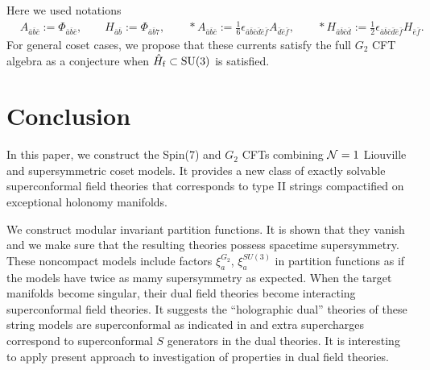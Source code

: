 \documentclass[a4paper,12pt]{article}
\numberwithin{equation}{section}
\newcommand{\Ncal}{{\cal N}}
\newcommand{\As}{*A}
\newcommand{\Hs}{*H}
\newcommand{\Spin}[1]{{\rm Spin}(#1)}
\newcommand{\SU}[1]{{\rm SU}(#1)}
\newcommand{\Hf}{\hat{H}_{\rm f}}
\newcommand{\gh}[1]{\bar{#1}}
\newcommand{\ab}{\gh a}
\newcommand{\bb}{\gh b}
\newcommand{\cb}{\gh c}
\newcommand{\db}{\gh d}
\newcommand{\eb}{\gh e}
\newcommand{\fb}{\gh f}
\begin{document}
Here we used notations
\begin{align*}
 &A_{\ab\bb\cb}:=\Phi_{\ab\bb\cb},\qquad H_{\ab\bb}:=\Phi_{\ab\bb 7},\qquad
   \As_{\ab\bb\cb}:=\frac{1}{6}
              \epsilon_{\ab\bb\cb\db\eb\fb}A_{\db\eb\fb},\qquad
   \Hs_{\ab\bb\cb\db}:=\frac{1}{2}\epsilon_{\ab\bb\cb\db\eb\fb}H_{\eb\fb}.
\end{align*}
For general coset cases, 
we propose that these currents satisfy the full $G_2$ CFT algebra 
as a conjecture when $\Hf \subset \SU3$ is satisfied. 


\section{Conclusion}\label{conclusion}
In this paper, we construct the \Spin 7 and $G_2$ CFTs combining
 $\Ncal=1$ Liouville and supersymmetric coset models. 
It provides a new class of exactly solvable superconformal field
theories that corresponds to type II strings compactified on 
exceptional holonomy manifolds. 

We construct 
modular invariant
partition functions. 
It is shown that they vanish and 
we make sure that the resulting theories 
possess spacetime supersymmetry.
These noncompact models include 
factors $\xi^{G_2}_a$, $\xi^{SU(3)}_a$ 
in partition functions as if 
the models have twice as mamy supersymmetry as expected.
When the target manifolds become singular, 
their dual field theories become interacting superconformal 
field theories.
It suggests the ``holographic dual'' theories
of these string models
are superconformal as indicated in \cite{Yamaguchi:2001kq} 
and extra supercharges correspond to superconformal $S$ 
generators in the dual theories.
It is interesting to apply present approach to investigation of 
properties in dual field theories. 
\end{document}
